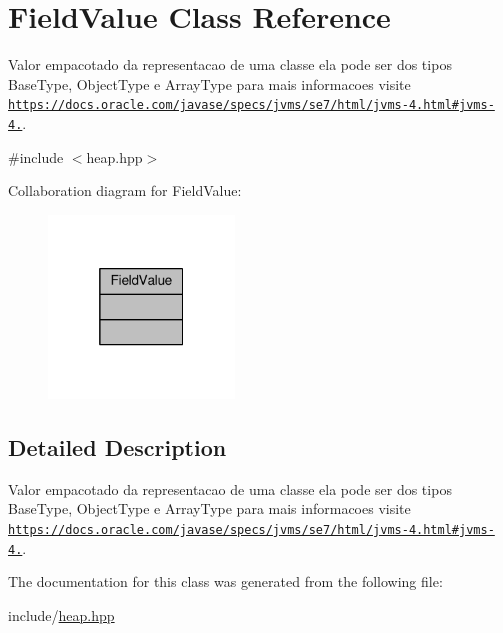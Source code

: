 \hypertarget{classFieldValue}{\section{Field\+Value Class Reference}
\label{classFieldValue}
}


Valor empacotado da representacao de uma classe ela pode ser dos tipos Base\+Type, Object\+Type e Array\+Type para mais informacoes visite \href{https://docs.oracle.com/javase/specs/jvms/se7/html/jvms-4.html#jvms-4.5}{\tt https\+://docs.\+oracle.\+com/javase/specs/jvms/se7/html/jvms-\/4.\+html\#jvms-\/4.}.  




{\ttfamily \#include $<$heap.\+hpp$>$}



Collaboration diagram for Field\+Value\+:
\nopagebreak
\begin{figure}[H]
\begin{center}
\leavevmode
\includegraphics[width=140pt]{classFieldValue__coll__graph}
\end{center}
\end{figure}


\subsection{Detailed Description}
Valor empacotado da representacao de uma classe ela pode ser dos tipos Base\+Type, Object\+Type e Array\+Type para mais informacoes visite \href{https://docs.oracle.com/javase/specs/jvms/se7/html/jvms-4.html#jvms-4.5}{\tt https\+://docs.\+oracle.\+com/javase/specs/jvms/se7/html/jvms-\/4.\+html\#jvms-\/4.}. 

The documentation for this class was generated from the following file\+:\begin{DoxyCompactItemize}
\item 
include/\hyperlink{heap_8hpp}{heap.\+hpp}\end{DoxyCompactItemize}
